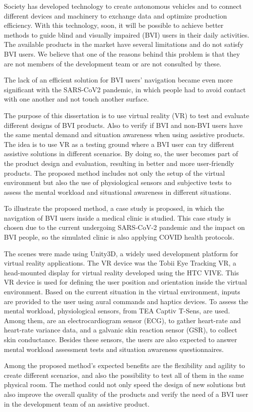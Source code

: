 
Society has developed technology to create autonomous vehicles and to connect different devices and machinery to exchange data and optimize production efficiency.  With this technology, soon, it will be possible to achieve better methods to guide blind and visually impaired (BVI) users in their daily activities. The available products in the market have several limitations and do not satisfy BVI users. We believe that one of the reasons behind this problem is that they are not members of the development team or are not consulted by these. 

The lack of an efficient solution for BVI users' navigation became even more significant with the SARS-CoV2 pandemic, in which people had to avoid contact with one another and not touch another surface.

The purpose of this dissertation is to use virtual reality (VR) to test and evaluate different designs of BVI products. Also to verify if BVI and non-BVI users have the same mental demand and situation awareness when using assistive products. The idea is to use VR as a testing ground where a BVI user can try different assistive solutions in different scenarios. By doing so, the user becomes part of the product design and evaluation, resulting in better and more user-friendly products. The proposed method includes not only the setup of the virtual environment but also the use of physiological sensors and subjective tests to assess the mental workload and situational awareness in different situations.

To illustrate the proposed method, a case study is proposed, in which the navigation of BVI users inside a medical clinic is studied. This case study is chosen due to the current undergoing SARS-CoV-2 pandemic and the impact on BVI people, so the simulated clinic is also applying COVID health protocols.

The scenes were made using Unity3D, a widely used development platform for virtual reality applications. The VR device was the Tobii Eye Tracking VR, a head-mounted display for virtual reality developed using the HTC VIVE. This VR device is used for defining the user position and orientation inside the virtual environment. Based on the current situation in the virtual environment, inputs are provided to the user using aural commands and haptics devices. To assess the mental workload, physiological sensors, from TEA Captiv T-Sens, are used. Among them, are an electrocardiogram sensor (ECG), to gather heart-rate and heart-rate variance data, and a galvanic skin reaction sensor (GSR), to collect skin conductance. Besides these sensors, the users are also expected to answer mental workload assessment tests and situation awareness questionnaires.

Among the proposed method's expected benefits are the flexibility and agility to create different scenarios, and also the possibility to test all of them in the same physical room. The method could not only speed the design of new solutions but also improve the overall quality of the products and verify the need of a BVI user in the development team of an assistive product.
